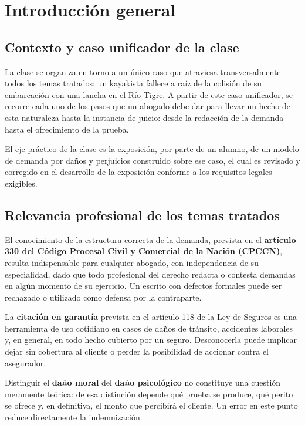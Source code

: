 \documentclass[12pt,oneside]{book}
\begin{document}

\chapter{Introducción general}

\section{Contexto y caso unificador de la clase}

La clase se organiza en torno a un único caso que atraviesa transversalmente todos los temas tratados: un kayakista fallece a raíz de la colisión de su embarcación con una lancha en el Río Tigre. A partir de este caso unificador, se recorre cada uno de los pasos que un abogado debe dar para llevar un hecho de esta naturaleza hasta la instancia de juicio: desde la redacción de la demanda hasta el ofrecimiento de la prueba.

El eje práctico de la clase es la exposición, por parte de un alumno, de un modelo de demanda por daños y perjuicios construido sobre ese caso, el cual es revisado y corregido en el desarrollo de la exposición conforme a los requisitos legales exigibles.

\section{Relevancia profesional de los temas tratados}

El conocimiento de la estructura correcta de la demanda, prevista en el \textbf{artículo 330 del Código Procesal Civil y Comercial de la Nación (CPCCN)}, resulta indispensable para cualquier abogado, con independencia de su especialidad, dado que todo profesional del derecho redacta o contesta demandas en algún momento de su ejercicio. Un escrito con defectos formales puede ser rechazado o utilizado como defensa por la contraparte.

La \textbf{citación en garantía} prevista en el artículo 118 de la Ley de Seguros es una herramienta de uso cotidiano en casos de daños de tránsito, accidentes laborales y, en general, en todo hecho cubierto por un seguro. Desconocerla puede implicar dejar sin cobertura al cliente o perder la posibilidad de accionar contra el asegurador.

Distinguir el \textbf{daño moral} del \textbf{daño psicológico} no constituye una cuestión meramente teórica: de esa distinción depende qué prueba se produce, qué perito se ofrece y, en definitiva, el monto que percibirá el cliente. Un error en este punto reduce directamente la indemnización.
\end{document}
